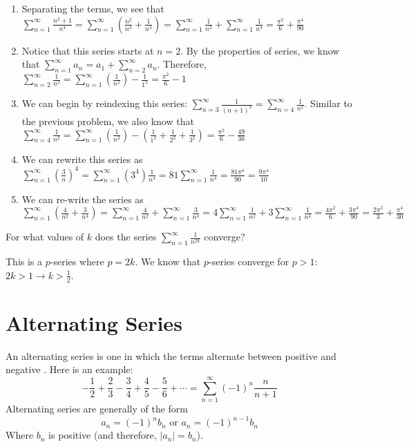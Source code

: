 \begin{Answer}[ref = euler1]
\begin{enumerate}
\item Separating the terms, we see that $\sum_{n=1}^\infty \frac{n^2 + 1}{n^4} 
= \sum_{n=1}^\infty \left( \frac{n^2}{n^4} + \frac{1}{n^4} \right) = \sum_{n=1}
^\infty \frac{1}{n^2} + \sum_{n=1}^\infty \frac{1}{n^4} = \frac{\pi^2}{6} + 
\frac{\pi^4}{90}$
\item Notice that this series starts at $n = 2$. By the properties of series, 
we know that $\sum_{n=1}^\infty a_n = a_1 + \sum_{n=2}^\infty a_n$. Therefore, 
$\sum_{n=2}^\infty \frac{1}{n^2} = \sum_{n=1}^\infty \left( \frac{1}{n^2} 
\right) - \frac{1}{1^2} = \frac{\pi^2}{6} - 1$
\item We can begin by reindexing this series: $\sum_{n=3}^\infty \frac{1}{(n + 
1)^2} = \sum_{n=4}^\infty \frac{1}{n^2}$. Similar to the previous problem, we 
also know that $\sum_{n=4}^\infty \frac{1}{n^2} = \sum_{n=1}^\infty \left( 
\frac{1}{n^2} \right) - \left( \frac{1}{1^2} + \frac{1}{2^2} + \frac{1}{3^2} 
\right) = \frac{\pi^2}{6} - \frac{49}{36}$
\item We can rewrite this series as $\sum_{n=1}^\infty \left( \frac{3}{n} 
\right)^4 = \sum_{n=1}^\infty (3^4)\frac{1}{n^4} = 81 \sum_{n=1}^\infty 
\frac{1}{n^4} = \frac{81\pi^4}{90} = \frac{9\pi^4}{10}$
\item We can re-write the series as $\sum_{n=1}^\infty \left( \frac{4}{n^2} + 
\frac{3}{n^4} \right) = \sum_{n=1}^\infty \frac{4}{n^2} + \sum_{n=1}^\infty 
\frac{3}{n^4} = 4 \sum_{n=1}^\infty \frac{1}{n^2} + 3 \sum_{n=1}^\infty 
\frac{1}{n^4} = \frac{4\pi^2}{6} + \frac{3\pi^4}{90} = \frac{2\pi^2}{3} + 
\frac{\pi^4}{30}$
\end{enumerate}
\end{Answer}

\begin{Exercise}[label = pseries1]
For what values of $k$ does the series $\sum_{n = 1}^\infty \frac{1}{n^{2k}}$ 
converge?
\end{Exercise}

\begin{Answer}[ref = pseries1]
This is a $p$-series where $p = 2k$. We know that $p$-series converge for $p > 
1$: $2k > 1 \rightarrow k > \frac{1}{2}$. 
\end{Answer}

\section{Alternating Series}
An alternating series is one in which the terms alternate between positive and 
negative . Here is an example:
$$-\frac{1}{2} + \frac{2}{3} - \frac{3}{4} + \frac{4}{5} - \frac{5}{6} + 
\cdots = \sum_{n=1}^\infty (-1)^n \frac{n}{n + 1}$$
Alternating series are generally of the form
$$a_n = (-1)^n b_n \text{ or } a_n = (-1)^{n - 1} b_n$$
Where $b_n$ is positive (and therefore, $|a_n| = b_n$).

